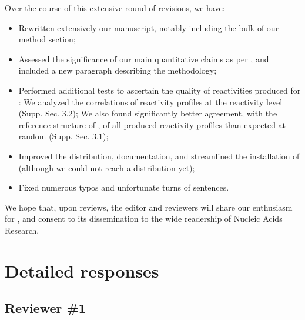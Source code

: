 \documentclass[9pt,hyperref]{article} %
\begin{document}
Over the course of this extensive round of revisions, we have:
\begin{itemize}
  \item Rewritten extensively our manuscript, notably including the bulk of our method section;
  \item Assessed the significance of our main quantitative claims as per \cite{Xu2012}, and included a new paragraph describing the methodology;
  \item Performed additional tests to ascertain the quality of reactivities produced for \didy: We analyzed the correlations of reactivity profiles at the reactivity level (Supp. Sec. 3.2); We also found significantly better agreement, with the reference structure of \cite{Meyer2014}, of all produced reactivity profiles than expected at random (Supp. Sec. 3.1);
  \item Improved the distribution, documentation, and streamlined the installation of \OurTool (although we could not reach a  distribution yet);
  \item Fixed numerous typos and unfortunate turns of sentences.
\end{itemize}

We hope that, upon reviews, the editor and reviewers will share our enthusiasm for \OurTool, and consent to its dissemination to the wide readership of Nucleic Acids Research.

\section{Detailed responses}

\subsection{Reviewer \#1}
\end{document}
